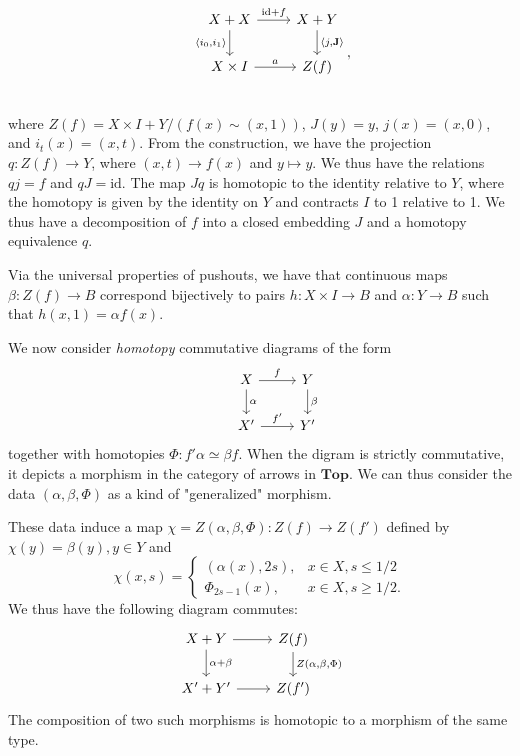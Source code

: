\documentclass{article}
\theoremstyle{definition}
\newcommand{\cat}{\mathbf}
\begin{document}
\[
\begin{tikzcd}
&X+X \arrow[r,"\text{id}+f"] \arrow[d,"\langle{i_{0},i_{1}}\rangle"'] &X+Y\arrow[d,"\langle{j,\mathbf{J}}\rangle"]\\
&X\times I\arrow[r,"a"] &Z(f)\\
\end{tikzcd}
,\]
where $Z(f)=X\times I+Y/(f(x)\sim(x,1))$, $J(y)=y$, $j(x)=(x,0)$, and $i_{t}(x)=(x,t).$ From the construction, we have the projection $q:Z(f)\rightarrow Y$, where $(x,t)\rightarrow f(x)$ and $y\mapsto y$. We thus have the relations $qj=f$ and $qJ=\text{id}$. The map $Jq$ is homotopic to the identity relative to $Y$, where the homotopy is given by the identity on $Y$ and contracts $I$ to 1 relative to 1. We thus have a decomposition of $f$ into a closed embedding $J$ and a homotopy equivalence $q$.

Via the universal properties of pushouts, we have that continuous maps $\beta:Z(f)\rightarrow B$ correspond bijectively to pairs $h:X\times I\rightarrow B$ and $\alpha:Y\rightarrow B$ such that $h(x,1)=\alpha f(x).$

We now consider \textit{homotopy} commutative diagrams of the form
\[
\begin{tikzcd}
&X\arrow[r,"f"]\arrow[d,"\alpha"]  &Y\arrow[d,"\beta"]\\
&X'\arrow[r,"f'"] &Y'
\end{tikzcd}
\]
together with homotopies $\Phi:f'\alpha\simeq\beta f.$ When the digram is strictly commutative, it depicts a morphism in the category of arrows in $\cat{Top}$. We can thus consider the data $(\alpha,\beta,\Phi)$ as a kind of "generalized" morphism. 

These data induce a map $\chi=Z(\alpha,\beta,\Phi):Z(f)\rightarrow Z(f')$ defined by $\chi(y)=\beta(y),y\in Y$ and
\[
\chi(x,s)=
\begin{cases}
(\alpha(x),2s), &x\in X,s\leq1/2\\
\Phi_{2s-1}(x), &x\in X,s\geq 1/2.
\end{cases}
\]
We thus have the following diagram commutes:
\[
\begin{tikzcd}
X+Y\arrow[r]\arrow[d,"\alpha+\beta"] &Z(f)\arrow[d,"Z\left({\alpha,\beta,\Phi}\right)"]\\
X'+Y'\arrow[r] &Z(f')
\end{tikzcd}
\]
The composition of two such morphisms is homotopic to a morphism of the same type. 
\end{document}
